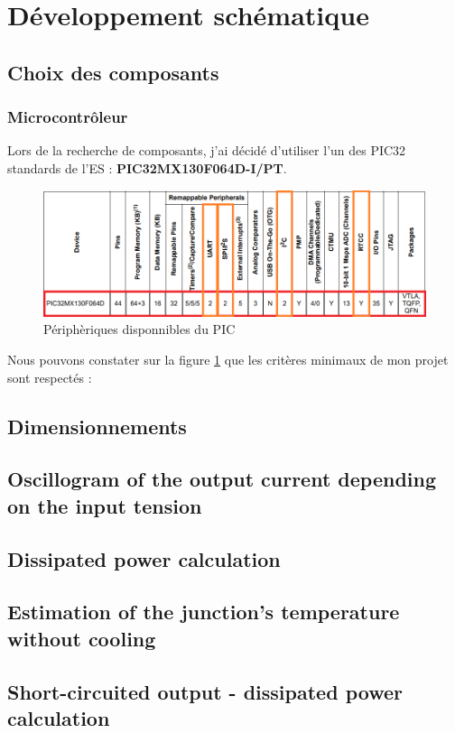 \section{Développement schématique}

\clearpage
\subsection{Choix des composants} \label{ssec:num32}
{
	\subsubsection{Microcontrôleur}
	Lors de la recherche de composants, j'ai décidé d'utiliser l'un des PIC32 standards de l'ES :
	\textbf{PIC32MX130F064D-I/PT}.
		
	\begin{figure}[h]
		\centering
		\includegraphics[width=1\linewidth]{Figures/Dev-SCH/PIC32-choisi}
		\caption{Périphèriques disponnibles du PIC}
		\label{fig:pic32-choisi}
	\end{figure}
	
	Nous pouvons constater sur la figure \ref{fig:pic32-choisi} que les critères minimaux de mon projet sont respectés :
	
	\begin{center}
		   
	\end{center}
\subsection{Dimensionnements} \label{ssec:num31}
{}
}
\subsection{Oscillogram of the output current depending on the input tension} \label{ssec:num33}
{}
\subsection{Dissipated power calculation} \label{ssec:num34}
{}
\subsection{Estimation of the junction's temperature without cooling} \label{ssec:num35}
{}
\subsection{Short-circuited output - dissipated power calculation} \label{ssec:num36}
{}
\clearpage